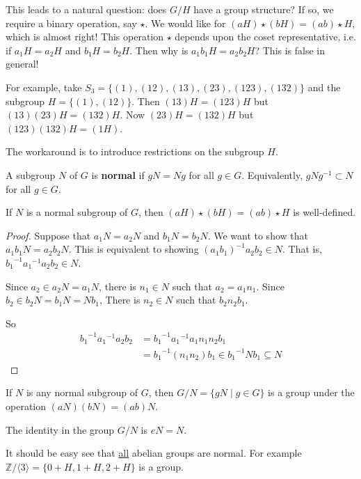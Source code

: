 This leads to a natural question: does $G/H$ have a group structure? If so, we require a binary operation, say $\star$. We would like for $(aH)\star(bH)=(ab)\star H$, which is almost right! This operation $\star$ depends upon the coset representative, i.e. if $a_1H=a_2H$ and $b_1H=b_2H$. Then why is $a_1b_1H=a_2b_2H$? This is false in general!

For example, take $S_3=\{(1),(12),(13),(23),(123),(132)\}$ and the subgroup $H=\{(1),(12)\}$. Then $(13)H=(123)H$ but $(13)(23)H=(132)H$. Now $(23)H=(132)H$ but $(123)(132)H=(1H)$.

The workaround is to introduce restrictions on the subgroup $H$.

\begin{definition}
	A subgroup $N$ of $G$ is \textbf{normal} if $gN=Ng$ for all $g\in G$. Equivalently, $gNg^{-1}\subset N$ for all $g\in G$.
\end{definition}

\begin{lemma}
	If $N$ is a normal subgroup of $G$, then $(aH)\star(bH)=(ab)\star H$ is well-defined.
\end{lemma}

\begin{proof}
	Suppose that $a_1N=a_2N$ and $b_1N=b_2N$. We want to show that $a_1b_1N=a_2b_2N$. This is equivalent to showing $(a_1b_1)^{-1}a_2b_2\in N$. That is, ${b_1}^{-1}{a_1}^{-1}a_2b_2\in N$.

	Since $a_2\in a_2N=a_1N$, there is $n_1\in N$ such that $a_2=a_1n_1$. Since $b_2\in b_2N=b_1N=Nb_1$, There is $n_2\in N$ such that $b_2n_2b_1$.

	So 
	\begin{align*}
		{b_1}^{-1}{a_1}^{-1}a_2b_2&={b_1}^{-1}{a_1}^{-1}a_1n_1n_2b_1\\
		&={b_1}^{-1}(n_1n_2)b_1\in {b_1}^{-1}Nb_1\subseteq N
	\end{align*}
\end{proof}

\begin{theorem}
	If $N$ is any normal subgroup of $G$, then $G/N=\{gN\mid g\in G\}$ is a group under the operation $(aN)(bN)=(ab)N$.
\end{theorem}

\begin{remark}
	The identity in the group $G/N$ is $eN=N$.
\end{remark}

It should be easy see that \underline{all} abelian groups are normal. For example $\mathbb Z/\langle 3\rangle=\{0+H,1+H,2+H\}$ is a group.